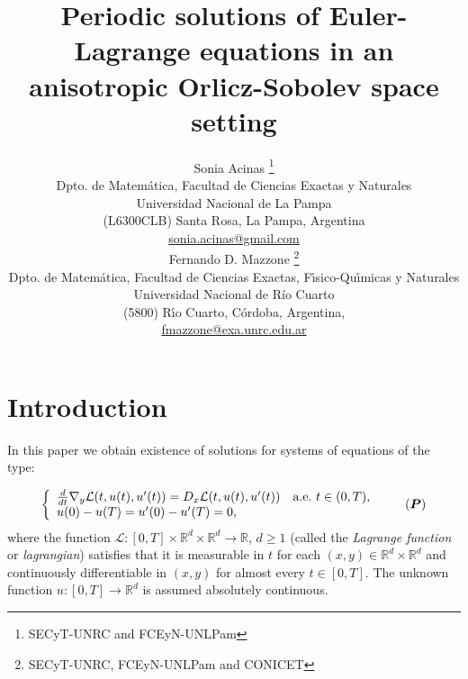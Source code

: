 \documentclass[twoside]{article}
\title{Periodic solutions of
Euler-Lagrange equations in an anisotropic Orlicz-Sobolev space setting  }
\author{Sonia Acinas \thanks{SECyT-UNRC and  FCEyN-UNLPam}\\
Dpto. de Matem\'atica, Facultad de Ciencias Exactas y Naturales\\
Universidad Nacional de La Pampa\\
(L6300CLB) Santa Rosa, La Pampa, Argentina\\
\url{sonia.acinas@gmail.com}\\[3mm]
Fernando D. Mazzone \thanks{SECyT-UNRC, FCEyN-UNLPam and CONICET}\\
Dpto. de Matem\'atica, Facultad de Ciencias Exactas, F\'{\i}sico-Qu\'{\i}micas y Naturales\\
Universidad Nacional de R\'{i}o Cuarto\\
(5800) R\'{\i}o Cuarto, C\'ordoba, Argentina,\\
\url{fmazzone@exa.unrc.edu.ar}
}
\date{}
\theoremstyle{remark}
\renewcommand{\b}[1]{\boldsymbol{#1}}
\newcommand{\rr}{\mathbb{R}}
\renewcommand{\geq}{\geqslant}
\begin{document}
\maketitle
%
\begingroup%
    \renewcommand{\thefootnote}{}%
    \endgroup
%
%
%
%

\begin{abstract}


\end{abstract}






\pagestyle{fancy} \headheight 35pt \fancyhead{} \fancyfoot{}

\fancyfoot[C]{\thepage}  \fancyhead[CO]{\nouppercase{\section}}

\fancyhead[CO]{\nouppercase{\leftmark}}






\section{Introduction}


In this paper we obtain existence of solutions for systems  of equations of the type:

\begin{equation}\label{ProbPrin-gral}
    \left\{%
\begin{array}{ll}
  \frac{d}{dt} \nabla_y\mathcal{L}(t,u(t),u'(t))= D_{x}\mathcal{L}(t,u(t),u'(t)) \quad \hbox{a.e.}\ t \in (0,T),\\
    u(0)-u(T)=u'(0)-u'(T)=0,
\end{array}%
\right. \tag{$\b{P}$}
\end{equation}
where the function $\mathcal{L}:[0,T]\times\rr^d\times\rr^d\to\rr$, $d\geq 1$ (called the \emph{Lagrange function} or \emph{lagrangian}) satisfies  that  it is measurable in $t$ for each $(x,y)\in \rr^d\times\rr^d$ and  continuously differentiable in $(x,y)$ for almost every $t \in [0,T]$. The unknown function  $u:[0,T]\to\rr^d$ is assumed absolutely continuous. 
\end{document}
